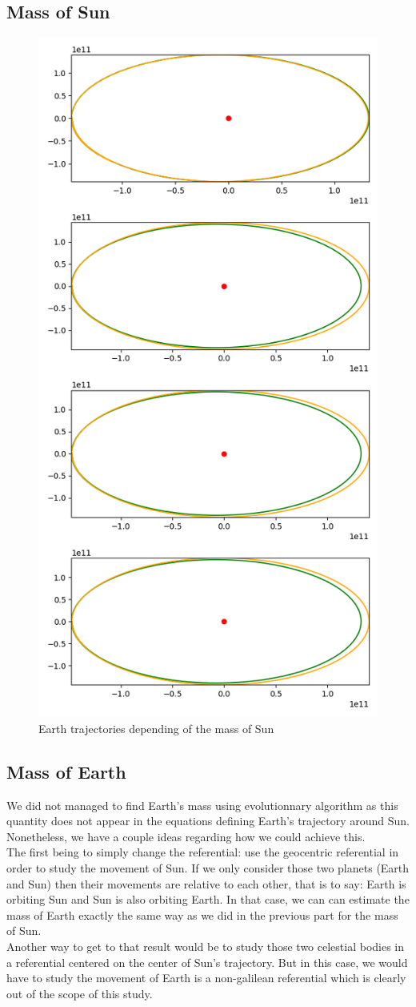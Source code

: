 \subsection{Mass of Sun}
\begin{figure}
    \center
    \includegraphics[width=0.5\linewidth,scale=.3]{img/sun_mass.png}
    \caption{Earth trajectories depending of the mass of Sun}
\end{figure}


\subsection{Mass of Earth}
We did not managed to find Earth's mass using evolutionnary algorithm as this quantity does not appear in the equations defining Earth's trajectory around Sun. Nonetheless, we have a couple ideas regarding how we could achieve this.\\
The first being to simply change the referential: use the geocentric referential in order to study the movement of Sun. If we only consider those two planets (Earth and Sun) then their movements are relative to each other, that is to say: Earth is orbiting Sun and Sun is also orbiting Earth. In that case, we can can estimate the mass of Earth exactly the same way as we did in the previous part for the mass of Sun.\\
Another way to get to that result would be to study those two celestial bodies in a referential centered on the center of Sun's trajectory. But in this case, we would have to study the movement of Earth is a non-galilean referential which is clearly out of the scope of this study.

